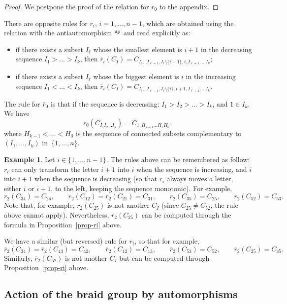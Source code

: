 \documentclass[10pt,a4paper]{amsart}
\numberwithin{equation}{section}
\theoremstyle{definition}
\newtheorem{exam}[theo]{Example}
\newcommand{\rb}{\overline{r}}
\begin{document}
\begin{proof}
We postpone the proof of the relation for $r_0$ to the appendix.
\end{proof}

There are opposite rules for $\rb_i$, $i=1,\dots,n-1$, which are obtained using the relation with the antiautomorphism ${}^{\rm up}$ and read explicitly as:
\begin{itemize}\itemsep=0pt
\item if there exists a subset $I_\ell$ whose the smallest element is $i+1$ in the decreasing sequence $I_1>\dots>I_k$, then
$\rb_i(C_I)= C_{I_1\dots I_{\ell-1}, I_{\ell}\setminus \{i+1\},i, I_{\ell+1},\dots I_k}$;

\item if there exists a subset $I_\ell$ whose the biggest element is $i$ in the increasing sequence $I_1<\dots<I_k$, then
$\rb_i(C_I)= C_{I_1\dots I_{\ell-1}, I_{\ell}\setminus \{i\},i+1, I_{\ell+1},\dots I_k}$.
\end{itemize}
The rule for $\rb_0$ is that if the sequence is decreasing: $I_1 > I_2 >\dots> I_k$, and $1\in I_k$. We have
\begin{equation*}
 \rb_0( C_{I_1I_2\dots I_k} ) = C_{1, H_{k-1} \dots H_{1}H_0},
\end{equation*}
where $H_{k-1}<\dots < H_0$ is the sequence of connected subsets complementary to $(I_1,\dots,I_k)$ in~$\{1,\dots,n\}$.


\begin{exam}
Let $i\in\{1,\dots,n-1\}$. The rules above can be remembered as follow: $r_i$ can only transform the letter $i+1$ into $i$ when the sequence is increasing, and $i$ into $i+1$ when the sequence is decreasing (so that $r_i$ always moves a letter, either $i$ or $i+1$, to the left, keeping the sequence monotonic). For example,
\[
r_2(C_{34})=C_{24} ,\qquad r_2(C_{12})=r_2(C_{21})=C_{31} ,\qquad r_2(C_{35})=C_{25} ,\qquad r_2(C_{52})=C_{53} .
\]
Note that, for example, $r_2(C_{25})$ is not another $C_I$ (since $C_{25}\neq C_{52}$, the rule above cannot apply). Nevertheless, $r_2(C_{25})$ can be computed through the formula in Proposition~\ref{prop-ri} above.

We have a similar (but reversed) rule for $\rb_i$, so that for example,
\[
\rb_2(C_{34})=\rb_2(C_{43})=C_{42} ,\qquad \rb_2(C_{12})=C_{13} ,\qquad \rb_2(C_{53})=C_{52} ,\qquad \rb_2(C_{25})=C_{35} .
\]
Similarly, $\rb_2(C_{52})$ is not another $C_I$ but can be computed through Proposition~\ref{prop-ri} above.
\end{exam}


\subsection{Action of the braid group by automorphisms}
\end{document}

